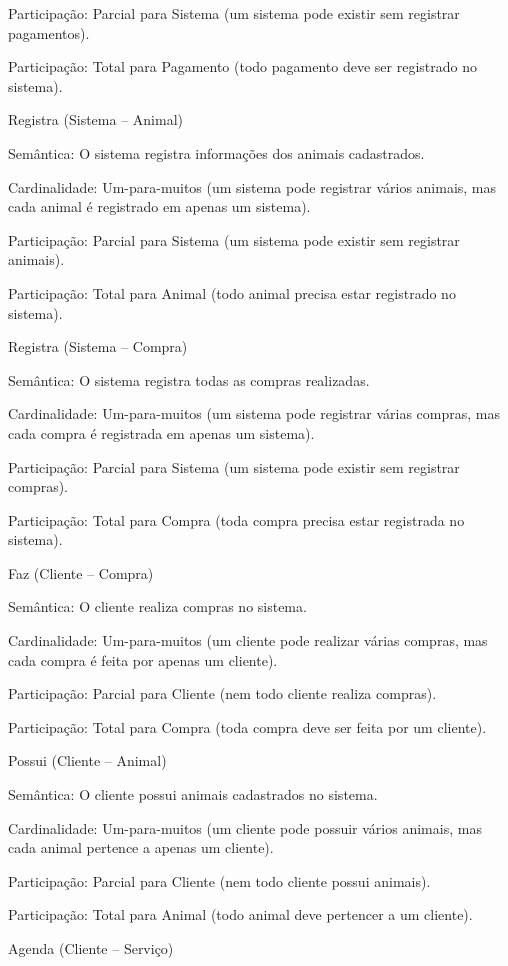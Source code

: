 \documentclass{article}
\begin{document}
Participação: Parcial para Sistema (um sistema pode existir sem registrar pagamentos). 

Participação: Total para Pagamento (todo pagamento deve ser registrado no sistema). 

Registra (Sistema – Animal) 

Semântica: O sistema registra informações dos animais cadastrados. 

Cardinalidade: Um-para-muitos (um sistema pode registrar vários animais, mas cada animal é registrado em apenas um sistema). 

Participação: Parcial para Sistema (um sistema pode existir sem registrar animais). 

Participação: Total para Animal (todo animal precisa estar registrado no sistema). 

Registra (Sistema – Compra) 

Semântica: O sistema registra todas as compras realizadas. 

Cardinalidade: Um-para-muitos (um sistema pode registrar várias compras, mas cada compra é registrada em apenas um sistema). 

Participação: Parcial para Sistema (um sistema pode existir sem registrar compras). 

Participação: Total para Compra (toda compra precisa estar registrada no sistema). 

Faz (Cliente – Compra) 

Semântica: O cliente realiza compras no sistema. 

Cardinalidade: Um-para-muitos (um cliente pode realizar várias compras, mas cada compra é feita por apenas um cliente). 

Participação: Parcial para Cliente (nem todo cliente realiza compras). 

Participação: Total para Compra (toda compra deve ser feita por um cliente). 

Possui (Cliente – Animal) 

Semântica: O cliente possui animais cadastrados no sistema. 

Cardinalidade: Um-para-muitos (um cliente pode possuir vários animais, mas cada animal pertence a apenas um cliente). 

Participação: Parcial para Cliente (nem todo cliente possui animais). 

Participação: Total para Animal (todo animal deve pertencer a um cliente). 

Agenda (Cliente – Serviço) 
\end{document}
